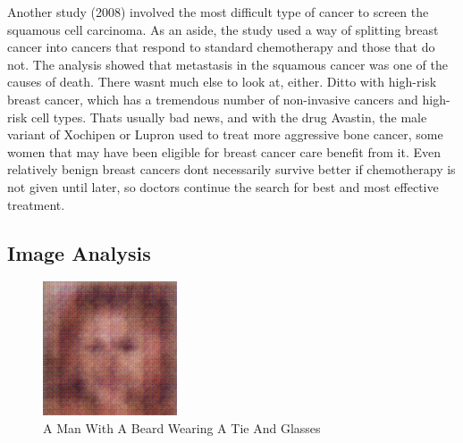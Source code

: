 \documentclass{article}%
\begin{document}
Another study (2008) involved the most difficult type of cancer to screen  the squamous cell carcinoma.\newline%
As an aside, the study used a way of splitting breast cancer into cancers that respond to standard chemotherapy and those that do not. The analysis showed that metastasis in the squamous cancer was one of the causes of death. There wasnt much else to look at, either.\newline%
Ditto with high{-}risk breast cancer, which has a tremendous number of non{-}invasive cancers and high{-}risk cell types. Thats usually bad news, and with the drug Avastin, the male variant of Xochipen or Lupron used to treat more aggressive bone cancer, some women that may have been eligible for breast cancer care benefit from it.\newline%
Even relatively benign breast cancers dont necessarily survive better if chemotherapy is not given until later, so doctors continue the search for best and most effective treatment.

%
\subsection{Image Analysis}%
\label{subsec:ImageAnalysis}%


\begin{figure}[h!]%
\centering%
\includegraphics[width=150px]{500_fake_images/samples_5_217.png}%
\caption{A Man With A Beard Wearing A Tie And Glasses}%
\end{figure}

%
\end{document}
